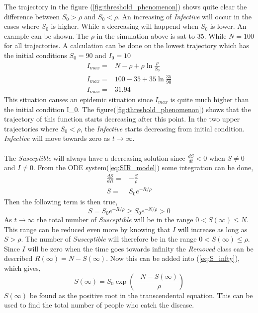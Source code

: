 \documentclass[%
twoside,                 %
final,                   %
10pt]{article}
\begin{document}
The trajectory in the figure (\ref{fig:threshold_phenomenon}) shows quite clear the difference between $S_0 > \rho$ and $S_0< \rho$. An increasing of \emph{Infective} will occur in the cases where $S_0$ is higher. While a decreasing will happend when $S_0$ is lower. An example can be shown. The $\rho$ in the simulation above is sat to 35. While $N=100$ for all trajectories. A calculation can be done on the lowest trajectory which has the initial conditions $S_0= 90$ and $I_0= 10$
\begin{align*}
I_{max} =& N-\rho + \rho \ln \frac{\rho}{S_0}\\
I_{max} =& 100-35 + 35 \ln \frac{35}{90}\\
I_{max} =& 31.94
\end{align*}
This situation causes an epidemic situation since $I_{max}$ is quite much higher than the initial condition I_0. The figure(\ref{fig:threshold_phenomenon}) shows that the trajectory of this function starts decreasing after this point. In the two upper trajectories where $S_0< \rho$, the \emph{Infective} starts decreasing from initial condition. \emph{Infective} will move towards zero as $t\rightarrow \infty$.
\\
\\
The \emph{Susceptible} will always have a decreasing solution since $\frac{dS}{dt}<0$ when $S\neq0$ and $I\neq0$. From the ODE system(\ref{eq:SIR_model}) some integration can be done,
\begin{align*}
\frac{dS}{dR} =& -\frac{S}{\rho}\\
S =& S_0e^{-R/\rho} 
\end{align*}
Then the following term is then true,
\begin{equation} \label{eq:S_infty}
S = S_0e^{-R/\rho} \geq S_0e^{-N/\rho} > 0
\end{equation}
As $t\rightarrow \infty$ the total number of \emph{Susceptible} will be in the range $0< S(\infty)\leq N$. This range can be reduced even more by knowing that $I$ will increase as long as $S> \rho$. The number of \emph{Susceptible} will therefore be in the range $0< S(\infty)\leq \rho$. Since $I$ will be zero when the time goes towards infinity the \emph{Removed} class can be described $R(\infty)= N -S(\infty)$. Now this can be added into (\ref{eq:S_infty}), which gives,
\begin{equation}
S(\infty) = S_0 \exp\left(-\frac{N-S(\infty)}{\rho}\right)
\end{equation}
$S(\infty)$ be found as the positive root in the transcendental equation. This can be used to find the total number of people who catch the disease.
\end{document}

